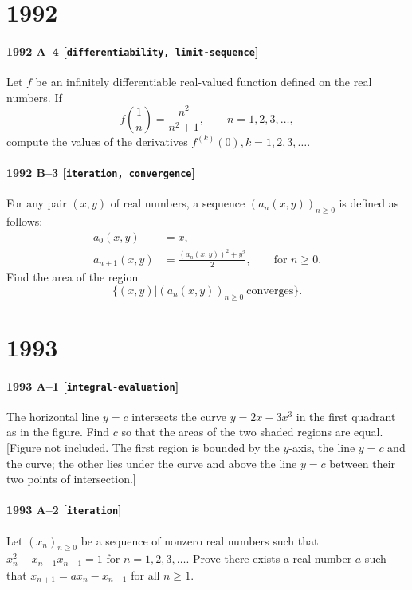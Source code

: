 \documentclass[11pt]{article}
\begin{document}
\section*{1992}

\paragraph{1992 A--4 \textnormal{[\texttt{differentiability, limit-sequence}]}}
Let $f$ be an infinitely differentiable real-valued function
defined on the real numbers. If
\[
f\left( \frac{1}{n} \right) = \frac{n^2}{n^2 + 1}, \qquad n = 1, 2, 3, \dots,
\]
compute the values of the derivatives $f^{(k)}(0), k = 1, 2, 3, \dots$.

\paragraph{1992 B--3 \textnormal{[\texttt{iteration, convergence}]}}
For any pair $(x, y)$ of real numbers, a sequence
$(a_n(x,y))_{n\geq 0}$ is defined as follows:
\begin{align*}
a_0(x, y) &= x, \\
a_{n+1}(x, y) &= \frac{(a_n(x, y))^2 + y^2}{2}, \qquad \mbox{for $n \geq 0$}.
\end{align*}
Find the area of the region
\[
\{ (x, y) | (a_n(x, y))_{n \geq 0}\ \mbox{converges}\}.
\]

\section*{1993}

\paragraph{1993 A--1 \textnormal{[\texttt{integral-evaluation}]}}
The horizontal line $y=c$ intersects the curve $y = 2x - 3x^3$
in the first quadrant as in the figure. Find $c$ so that the areas of the
two shaded regions are equal. [Figure not included. The first region is
bounded by the $y$-axis, the line $y=c$ and the curve; the other lies
under the curve and above the line $y=c$ between their two points of
intersection.]

\paragraph{1993 A--2 \textnormal{[\texttt{iteration}]}}
Let $(x_n)_{n \geq 0}$ be a sequence of nonzero real numbers
such that $x_n^2 - x_{n-1}x_{n+1} = 1$ for $n=1,2,3,\dots$. Prove there
exists a real number $a$ such that $x_{n+1} = ax_n - x_{n-1}$ for all $n
\geq 1$.
\end{document}
